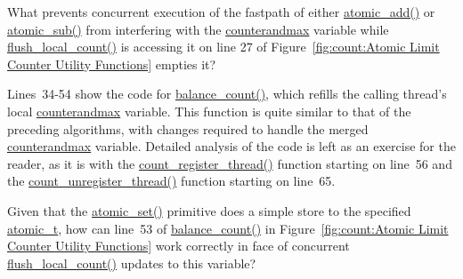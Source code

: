 \QuickQuiz{}
	What prevents concurrent execution of the fastpath of either
	\url{atomic_add()} or \url{atomic_sub()} from interfering with
	the \url{counterandmax} variable while
	\url{flush_local_count()} is accessing it on line 27 of
	Figure~\ref{fig:count:Atomic Limit Counter Utility Functions}
	empties it?
 \QuickQuizEnd

Lines~34-54 show the code for \url{balance_count()}, which refills
the calling thread's local \url{counterandmax} variable.
This function is quite similar to that of the preceding algorithms,
with changes required to handle the merged \url{counterandmax} variable.
Detailed analysis of the code is left as an exercise for the reader,
as it is with the \url{count_register_thread()} function starting on
line~56 and the \url{count_unregister_thread()} function starting on
line~65.

\QuickQuiz{}
	Given that the \url{atomic_set()} primitive does a simple
	store to the specified \url{atomic_t}, how can line~53 of
	\url{balance_count()} in
	Figure~\ref{fig:count:Atomic Limit Counter Utility Functions}
	work correctly in face of concurrent \url{flush_local_count()}
	updates to this variable?
 \QuickQuizEnd


